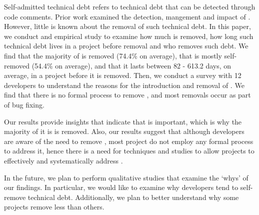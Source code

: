 Self-admitted technical debt refers to technical debt that can be detected through code comments. Prior work examined the detection, mangement and impact of \SATD. However, little is known about the removal of such technical debt. In this paper, we conduct and empirical study to examine how much \SATD is removed, how long such technical debt lives in a project before removal and who removes such debt. We find that the majority of \SATD is removed (74.4\% on average), that \SATD is mostly self-removed (54.4\% on average), and that it lasts between 82 - 613.2 days, on average, in a project before it is removed. Then, we conduct a survey with 12 developers to understand the reasons for the introduction and removal of \SATD. We find that there is no formal process to remove \SATD, and most removals occur as part of bug fixing.

Our results provide insights that indicate that \SATD is important, which is why the majority of it is is removed. Also, our results suggest that although developers are aware of the need to remove \SATD, most project do not employ any formal process to address it, hence there is a need for techniques and studies to allow projects to effectively and systematically address \SATD.

In the future, we plan to perform qualitative studies that examine the `whys' of our findings. In particular, we would like to examine why developers tend to self-remove technical debt. Additionally, we plan to better understand why some projects remove less \SATD than others.